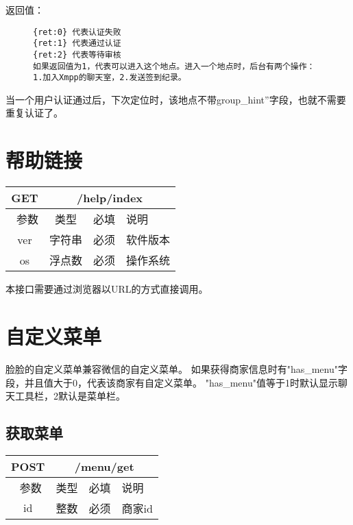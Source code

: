 \documentclass[cs4size]{ctexartutf8}
\begin{document}
返回值：
\begin{figure}[H]
\begin{verbatim}
{ret:0} 代表认证失败
{ret:1} 代表通过认证
{ret:2} 代表等待审核
如果返回值为1，代表可以进入这个地点。进入一个地点时，后台有两个操作：1.加入Xmpp的聊天室，2.发送签到纪录。
\end{verbatim}
\end{figure}

当一个用户认证通过后，下次定位时，该地点不带group\_hint”字段，也就不需要重复认证了。








\section{帮助链接}

\begin{table}[H]
   \begin{center}
\begin{tabular}{|c|c|c|p{12cm}|}
\hline
GET & \multicolumn{3}{|c|}{/help/index} \\
\hline\hline
 \  参数  & 类型 & 必填 &  说明  \\
 \hline
 ver  & 字符串 & 必须 & 软件版本\\
\hline
 os  & 浮点数 & 必须 & 操作系统\\
\hline
\end{tabular}
   \end{center}
\end{table}

本接口需要通过浏览器以URL的方式直接调用。


\section{自定义菜单}
脸脸的自定义菜单兼容微信的自定义菜单。
如果获得商家信息时有"has\_menu"字段，并且值大于0，代表该商家有自定义菜单。 "has\_menu"值等于1时默认显示聊天工具栏，2默认是菜单栏。

\subsection{获取菜单}

\begin{table}[H]
   \begin{center}
\begin{tabular}{|c|c|c|p{12cm}|}
\hline
POST & \multicolumn{3}{|c|}{/menu/get} \\
\hline\hline
 \  参数  & 类型 & 必填 &  说明  \\
   \hline
 id  & 整数 & 必须 & 商家id\\ 
  \hline
\end{tabular}
   \end{center}
\end{table}
\end{document}

